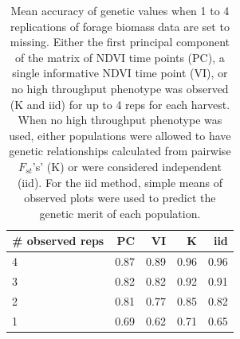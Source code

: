 \documentclass[12pt, letterpaper]{article}
\begin{document}
\begin{table}[ht]
\caption{Mean accuracy of genetic values when 1 to 4 replications of forage biomass data are set to missing. Either the first principal component of the matrix of NDVI time points (PC), a single informative NDVI time point (VI), or no high throughput phenotype was observed (K and iid) for up to 4 reps for each harvest. When no high throughput phenotype was used, either populations were allowed to have genetic relationships calculated from pairwise $F_{st}$'s' (K) or were considered independent (iid). For the iid method, simple means of observed plots were used to predict the genetic merit of each population.}

\centering
\begin{tabular*}{\hsize}{@{\extracolsep{\fill}}lrrrr}
  \hline
 \# observed reps & PC & VI & K & iid \\ 
  \hline
  4 & 0.87 & 0.89 & 0.96 & 0.96 \\ 
  3 & 0.82 & 0.82 & 0.92 & 0.91 \\ 
  2 & 0.81 & 0.77 & 0.85 & 0.82 \\ 
  1 & 0.69 & 0.62 & 0.71 & 0.65 \\ 
   \hline
\end{tabular*}
\label{predRepsMean}
\end{table}
\end{document}
